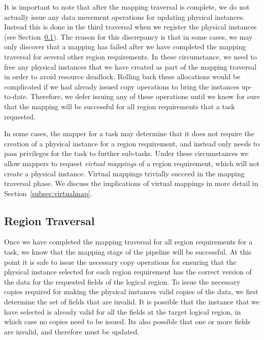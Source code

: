 It is important to note that after the mapping
traversal is complete, we do not actually
issue any data movement operations for
updating physical instances.  Instead this
is done in the third traversal when we register
the physical instances (see 
Section~\ref{subsec:regiontraversal}). The reason
for this discrepancy is that in some cases, we
may only discover that a mapping has failed
after we have completed the mapping traversal
for several other region requirements. In these
circumstance, we need to free any physical instances
that we have created as part of the mapping 
traversal in order to avoid resource deadlock.
Rolling back these allocations would be complicated
if we had already issued copy operations to bring
the instances up-to-date. Therefore, we defer 
issuing any of these operations until we know for
sure that the mapping will be successful for 
all region requirements that a task requested.

In some cases, the mapper for a task may determine
that it does not require the creation of a physical
instance for a region requirement, and instead
only needs to pass privileges for the task to
further sub-tasks. Under these circumstances we
allow mappers to request {\em virtual mappings}
of a region requirement, which will not create
a physical instance.  Virtual mappings trivially
succeed in the mapping traversal phase. We discuss
the implications of virtual mappings in more
detail in Section~\ref{subsec:virtualmap}.

\subsection{Region Traversal}
\label{subsec:regiontraversal}
Once we have completed the mapping traversal
for all region requirements for a task, we know
that the mapping stage of the pipeline will
be successful. At this point it is safe to 
issue the necessary copy operations for ensuring
that the physical instance selected for each
region requirement has the correct version of
the data for the requested fields of the logical region. 
To issue the necessary copies required for making
the physical instances valid copies of the data, 
we first determine the set of fields that are invalid. 
It is possible that the instance that we have selected
is already valid for all the fields at the target
logical region, in which case no copies need to be
issued. Its also possible that one or more fields
are invalid, and therefore must be updated.

